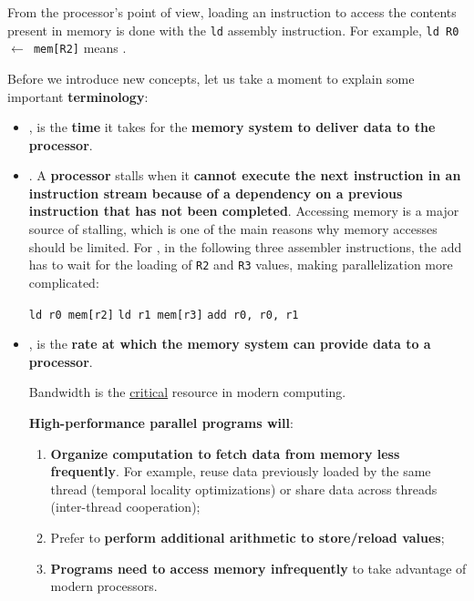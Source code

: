 \noindent
From the processor's point of view, loading an instruction to access the contents present in memory is done with the \texttt{ld} assembly instruction. For example, \texttt{ld R0 $\leftarrow$ mem[R2]} means .

\highspace
Before we introduce new concepts, let us take a moment to explain some important \textbf{terminology}:
\begin{itemize}
    \item {}, is the \textbf{time} it takes for the \textbf{memory system to deliver data to the processor}.
    
    \item {}. A \textbf{processor} stalls when it \textbf{cannot execute the next instruction in an instruction stream because of a dependency on a previous instruction that has not been completed}. Accessing memory is a major source of stalling, which is one of the main reasons why memory accesses should be limited. 
    \newpage
    For , in the following three assembler instructions, the add has to wait for the loading of \texttt{R2} and \texttt{R3} values, making parallelization more complicated:
    \begin{flushleft}
    	\texttt{ld r0 mem[r2]}\newline
    	\texttt{ld r1 mem[r3]}\newline
    	\texttt{add r0, r0, r1}
    \end{flushleft}
    
    \item {}, is the \textbf{rate at which the memory system can provide data to a processor}.

    Bandwidth is the \underline{critical} resource in modern computing.
    
    \textbf{High-performance parallel programs will}:
    \begin{enumerate}
        \item \textbf{Organize computation to fetch data from memory less frequently}. For example, reuse data previously loaded by the same thread (temporal locality optimizations) or share data across threads (inter-thread cooperation);
        
        \item Prefer to \textbf{perform additional arithmetic to store/reload values};
        
        \item \textbf{Programs need to access memory infrequently} to take advantage of modern processors.
    \end{enumerate}
\end{itemize}

